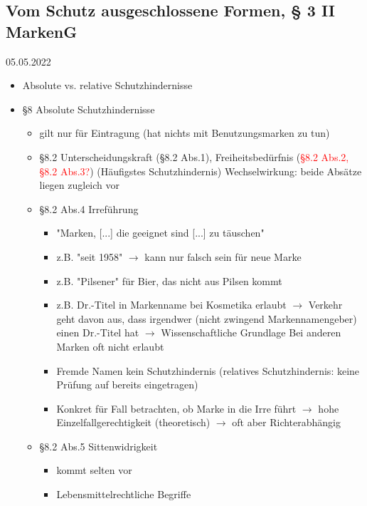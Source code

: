 \documentclass{report}
\begin{document}
\subsection{Vom Schutz ausgeschlossene Formen, § 3 II MarkenG} \label{marke-schutzhindernis}
05.05.2022
\begin{itemize}
	\item Absolute vs. relative Schutzhindernisse
	\item §8 Absolute Schutzhindernisse
	\begin{itemize}
		\item gilt nur für Eintragung (hat nichts mit Benutzungsmarken zu tun)
		\item §8.2
		\newline Unterscheidungskraft (§8.2 Abs.1), Freiheitsbedürfnis (\textcolor{red}{§8.2 Abs.2, §8.2 Abs.3?}) (Häufigstes Schutzhindernis)
		\newline Wechselwirkung: beide Absätze liegen zugleich vor
		\item §8.2 Abs.4 Irreführung
		\begin{itemize}
			\item "Marken, [...] die geeignet sind [...] zu täuschen"
			\item z.B. "seit 1958" $\rightarrow$ kann nur falsch sein für neue Marke
			\item z.B. "Pilsener" für Bier, das nicht aus Pilsen kommt
			\item z.B. Dr.-Titel in Markenname
			\newline bei Kosmetika erlaubt $\rightarrow$ Verkehr geht davon aus, dass irgendwer (nicht zwingend Markennamengeber) einen Dr.-Titel hat $\rightarrow$ Wissenschaftliche Grundlage
			\newline Bei anderen Marken oft nicht erlaubt
			\item Fremde Namen kein Schutzhindernis (relatives Schutzhindernis: keine Prüfung auf bereits eingetragen)
			\item Konkret für Fall betrachten, ob Marke in die Irre führt
			\newline $\rightarrow$ hohe Einzelfallgerechtigkeit (theoretisch)
			\newline $\rightarrow$ oft aber Richterabhängig
		\end{itemize}
		\item §8.2 Abs.5 Sittenwidrigkeit
		\begin{itemize}
			\item kommt selten vor
			\item Lebensmittelrechtliche Begriffe

\end{itemize}
\end{itemize}
\end{itemize}
\end{document}
